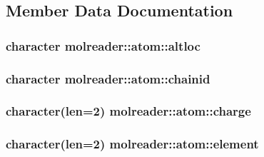 \subsection{Member Data Documentation}
\hypertarget{structmolreader_1_1atom_a6bed152132fdfceaf62c2627edd94419}{
\subsubsection[{altloc}]{\setlength{\rightskip}{0pt plus 5cm}character molreader\-::atom\-::altloc\hspace{0.3cm}{\ttfamily [private]}}}\label{structmolreader_1_1atom_a6bed152132fdfceaf62c2627edd94419}
\hypertarget{structmolreader_1_1atom_a40d33bfe323c5ba4969637d03f6f23c1}{
\subsubsection[{chainid}]{\setlength{\rightskip}{0pt plus 5cm}character molreader\-::atom\-::chainid\hspace{0.3cm}{\ttfamily [private]}}}\label{structmolreader_1_1atom_a40d33bfe323c5ba4969637d03f6f23c1}
\hypertarget{structmolreader_1_1atom_a2df0e8e4929647a81fce9d7ce76390cb}{
\subsubsection[{charge}]{\setlength{\rightskip}{0pt plus 5cm}character(len=2) molreader\-::atom\-::charge\hspace{0.3cm}{\ttfamily [private]}}}\label{structmolreader_1_1atom_a2df0e8e4929647a81fce9d7ce76390cb}
\hypertarget{structmolreader_1_1atom_a34e74d1598af7abd98aa9323ae538634}{
\subsubsection[{element}]{\setlength{\rightskip}{0pt plus 5cm}character(len=2) molreader\-::atom\-::element\hspace{0.3cm}{\ttfamily [private]}}}\label{structmolreader_1_1atom_a34e74d1598af7abd98aa9323ae538634}
